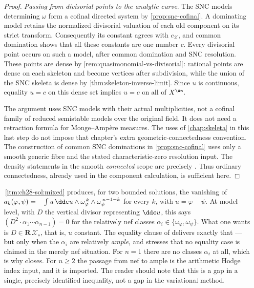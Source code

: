 \begin{proof}
\emph{Passing from divisorial points to the analytic curve.}
The SNC models determining \(\omega\) form a cofinal directed system
by \cref{prop:snc-cofinal}.  A dominating model retains the normalized
divisorial valuation of each old component on its strict transform.
Consequently its constant agrees with \(c_{\mathcal X}\), and common
domination shows that all these constants are one number \(c\).
Every divisorial point occurs on such a model, after common domination
and SNC resolution.  These points are dense by
\cref{rem:quasimonomial-vs-divisorial}: rational points are dense on each
skeleton and become vertices after subdivision, while the union of the
SNC skeleta is dense by \cref{thm:skeleton-inverse-limit}.
Since \(u\) is continuous, equality \(u=c\) on this dense set implies
\(u=c\) on all of \(X^{\An}\).

The argument uses SNC models with their actual multiplicities, not a
cofinal family of reduced semistable models over the original field.
It does not need a retraction formula for Monge--Amp\`ere measures.
The uses of \cref{chap:skeleta} in this last step do not impose that
chapter's extra geometric-connectedness convention.  The construction
of common SNC dominations in \cref{prop:snc-cofinal} uses only a
smooth generic fibre and the stated characteristic-zero resolution
input.  The density statements in the smooth \emph{connected} scope
are precisely \cite[\S2.4, Corollaries~2.4, 3.2 and 3.17]{BFJ16}.
Thus ordinary connectedness, already used in the component calculation,
is sufficient here.
\end{proof}

\begin{remark}
\label{rem:ch28-uniqueness-gap}
\,\cref{itm:ch28-sol:mixed} produces, for two
bounded solutions, the vanishing of
\(a_k(\varphi,\psi)=-\int u\,\ddc u\wedge
\omega_\varphi^{\,k}\wedge\omega_\psi^{\,n-1-k}\) for every \(k\), with
\(u=\varphi-\psi\).  At model level, with \(D\) the vertical divisor
representing \(\ddc u\), this says
\((D^2\cdot\alpha_1\cdots\alpha_{n-1})=0\) for the relatively nef classes
\(\alpha_i\in\{\omega_\varphi,\omega_\psi\}\).  What one wants is
\(D\in\mathbf R\,\mathcal X_s\), that is, \(u\) constant.  The equality
clause of  delivers exactly that ---
but only when the \(\alpha_i\) are relatively \emph{ample}, and
 stresses that no equality case is claimed in the
merely nef situation.  For \(n=1\) there are no classes
\(\alpha_i\) at all, which is why  closes.
For \(n\geq2\) the passage from nef to ample is the arithmetic Hodge index
input, and it is imported.  The reader should note that this is a gap in a
single, precisely identified inequality, not a gap in the variational
method.
\end{remark}


